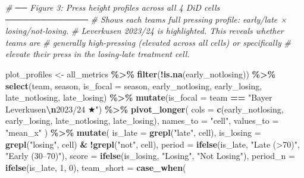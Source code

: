 \documentclass[
]{article}
\newenvironment{Shaded}{\begin{snugshade}}{\end{snugshade}}
\newcommand{\AttributeTok}[1]{\textcolor[rgb]{0.13,0.29,0.53}{#1}}
\newcommand{\CommentTok}[1]{\textcolor[rgb]{0.56,0.35,0.01}{\textit{#1}}}
\newcommand{\DecValTok}[1]{\textcolor[rgb]{0.00,0.00,0.81}{#1}}
\newcommand{\FunctionTok}[1]{\textcolor[rgb]{0.13,0.29,0.53}{\textbf{#1}}}
\newcommand{\NormalTok}[1]{#1}
\newcommand{\OtherTok}[1]{\textcolor[rgb]{0.56,0.35,0.01}{#1}}
\newcommand{\SpecialCharTok}[1]{\textcolor[rgb]{0.81,0.36,0.00}{\textbf{#1}}}
\newcommand{\StringTok}[1]{\textcolor[rgb]{0.31,0.60,0.02}{#1}}
\begin{document}
\begin{Shaded}
\begin{Highlighting}[]
\CommentTok{\# ── Figure 3: Press height profiles across all 4 DiD cells ──────────────}
\CommentTok{\# Shows each team\textquotesingle{}s full pressing profile: early/late × losing/not{-}losing.}
\CommentTok{\# Leverkusen 2023/24 is highlighted. This reveals whether teams are}
\CommentTok{\# generally high{-}pressing (elevated across all cells) or specifically}
\CommentTok{\# elevate their press in the losing{-}late treatment cell.}

\NormalTok{plot\_profiles }\OtherTok{\textless{}{-}}\NormalTok{ all\_metrics }\SpecialCharTok{\%\textgreater{}\%}
  \FunctionTok{filter}\NormalTok{(}\SpecialCharTok{!}\FunctionTok{is.na}\NormalTok{(early\_notlosing)) }\SpecialCharTok{\%\textgreater{}\%}
  \FunctionTok{select}\NormalTok{(team, season, }\AttributeTok{is\_focal =}\NormalTok{ season,}
\NormalTok{         early\_notlosing, early\_losing,}
\NormalTok{         late\_notlosing,  late\_losing) }\SpecialCharTok{\%\textgreater{}\%}
  \FunctionTok{mutate}\NormalTok{(}\AttributeTok{is\_focal =}\NormalTok{ team }\SpecialCharTok{==} \StringTok{"Bayer Leverkusen}\SpecialCharTok{\textbackslash{}n}\StringTok{2023/24 ★"}\NormalTok{) }\SpecialCharTok{\%\textgreater{}\%}
  \FunctionTok{pivot\_longer}\NormalTok{(}
    \AttributeTok{cols      =} \FunctionTok{c}\NormalTok{(early\_notlosing, early\_losing,}
\NormalTok{                  late\_notlosing,  late\_losing),}
    \AttributeTok{names\_to  =} \StringTok{"cell"}\NormalTok{,}
    \AttributeTok{values\_to =} \StringTok{"mean\_x"}
\NormalTok{  ) }\SpecialCharTok{\%\textgreater{}\%}
  \FunctionTok{mutate}\NormalTok{(}
    \AttributeTok{is\_late   =} \FunctionTok{grepl}\NormalTok{(}\StringTok{"late"}\NormalTok{,    cell),}
    \AttributeTok{is\_losing =} \FunctionTok{grepl}\NormalTok{(}\StringTok{"losing"}\NormalTok{,  cell) }\SpecialCharTok{\&} \SpecialCharTok{!}\FunctionTok{grepl}\NormalTok{(}\StringTok{"not"}\NormalTok{, cell),}
    \AttributeTok{period    =} \FunctionTok{ifelse}\NormalTok{(is\_late,   }\StringTok{"Late (\textgreater{}70\textquotesingle{})"}\NormalTok{, }\StringTok{"Early (30–70\textquotesingle{})"}\NormalTok{),}
    \AttributeTok{score     =} \FunctionTok{ifelse}\NormalTok{(is\_losing, }\StringTok{"Losing"}\NormalTok{,      }\StringTok{"Not Losing"}\NormalTok{),}
    \AttributeTok{period\_n  =} \FunctionTok{ifelse}\NormalTok{(is\_late, }\DecValTok{1}\NormalTok{, }\DecValTok{0}\NormalTok{),}
    \AttributeTok{team\_short =} \FunctionTok{case\_when}\NormalTok{(}

\end{Highlighting}
\end{Shaded}
\end{document}
